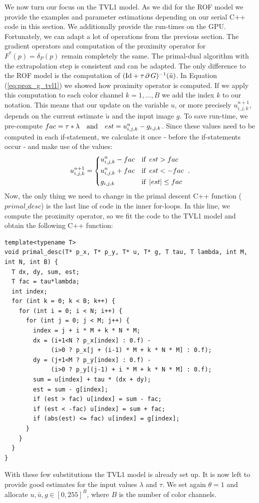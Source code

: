 \documentclass[abstracton]{scrreprt}
\begin{document}
        We now turn our focus on the TVL1 model. As we did for the ROF model we provide the examples and parameter estimations depending on our serial C++ code in this section. We additionally provide the run-times on the GPU. Fortunately, we can adapt a lot of operations from the previous section. The gradient operators and computation of the proximity operator for $F^{\ast}(p) = \delta_{P}(p)$ remain completely the same. The primal-dual algorithm with the extrapolation step is consistent and can be adapted. The only difference to the ROF model is the computation of $(\textnormal{Id} + \tau\,\partial\,G)^{-1}(\tilde{u})$. In Equation (\ref{eq:prox_g_tvl1}) we showed how proximity operator is computed. If we apply this computation to each color channel $k = 1, ..., B$ we add the index $k$ to our notation. This means that our update on the variable $u$, or more precisely $u^{n+1}_{i,j,k}$, depends on the current estimate $\tilde{u}$ and the input image $g$. To save run-time, we pre-compute $fac = \tau * \lambda \,\,\,\,\,\, \textnormal{and} \,\,\,\,\,\, est = u^{n}_{i,j,k} - g_{i,j,k}$. Since these values need to be computed in each if-statement, we calculate it once - before the if-statements occur - and make use of the values:
            $$
                u^{n+1}_{i,j,k} = 
                    \begin{dcases*}
                        u^{n}_{i,j,k} - fac & \textnormal{if\, $est > fac$} \\
                        u^{n}_{i,j,k} + fac & \textnormal{if\, $est < - fac$} \\
                        g_{i,j,k} & \textnormal{if\, $|est| \le fac$}
                    \end{dcases*}.
            $$
        Now, the only thing we need to change in the primal descent C++ function ($primal\_desc$) is the last line of code in the inner for-loops. In this line, we compute the proximity operator, so we fit the code to the TVL1 model and obtain the following C++ function:
        \begin{lstlisting}
template<typename T>
void primal_desc(T* p_x, T* p_y, T* u, T* g, T tau, T lambda, int M, int N, int B) {
  T dx, dy, sum, est;
  T fac = tau*lambda;
  int index;
  for (int k = 0; k < B; k++) {
    for (int i = 0; i < N; i++) {
      for (int j = 0; j < M; j++) {
        index = j + i * M + k * N * M;
        dx = (i+1<N ? p_x[index] : 0.f) -
             (i>0 ? p_x[j + (i-1) * M + k * N * M] : 0.f);
        dy = (j+1<M ? p_y[index] : 0.f) -
             (i>0 ? p_y[(j-1) + i * M + k * N * M] : 0.f);
        sum = u[index] + tau * (dx + dy);
        est = sum - g[index];
        if (est > fac) u[index] = sum - fac;
        if (est < -fac) u[index] = sum + fac;
        if (abs(est) <= fac) u[index] = g[index];
      }
    }
  }
}
        \end{lstlisting} 
        With these few substitutions the TVL1 model is already set up. It is now left to provide good estimates for the input values $\lambda$ and $\tau$. We set again $\theta = 1$ and allocate $u, \bar{u}, g \in [0, 255]^{B}$, where $B$ is the number of color channels.
\end{document}
